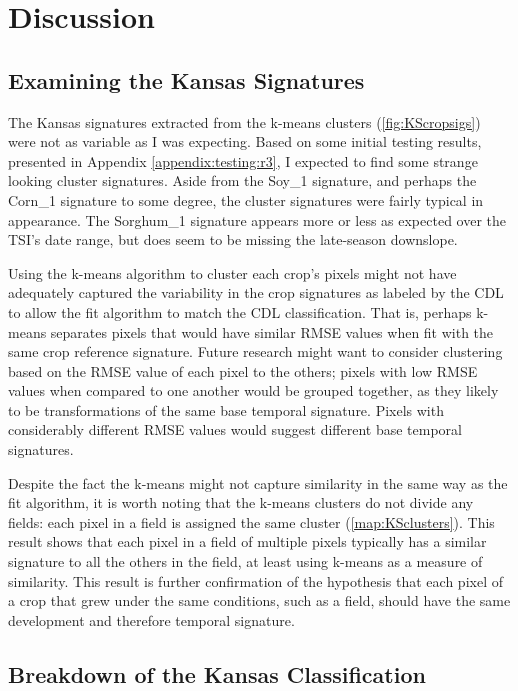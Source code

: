 \chapter{Discussion}

\section{Examining the Kansas Signatures}

The Kansas signatures extracted from the k-means clusters (\autoref{fig:KScropsigs}) were not as variable as I was expecting. Based on some initial testing results, presented in Appendix \ref{appendix:testing:r3}, I expected to find some strange looking cluster signatures. Aside from the Soy\_1 signature, and perhaps the Corn\_1 signature to some degree, the cluster signatures were fairly typical in appearance. The Sorghum\_1 signature appears more or less as expected over the TSI's date range, but does seem to be missing the late-season downslope.

Using the k-means algorithm to cluster each crop's pixels might not have adequately captured the variability in the crop signatures as labeled by the CDL to allow the fit algorithm to match the CDL classification. That is, perhaps k-means separates pixels that would have similar RMSE values when fit with the same crop reference signature. Future research might want to consider clustering based on the RMSE value of each pixel to the others; pixels with low RMSE values when compared to one another would be grouped together, as they likely to be transformations of the same base temporal signature. Pixels with considerably different RMSE values would suggest different base temporal signatures.

Despite the fact the k-means might not capture similarity in the same way as the fit algorithm, it is worth noting that the k-means clusters do not divide any fields: each pixel in a field is assigned the same cluster (\autoref{map:KSclusters}). This result shows that each pixel in a field of multiple pixels typically has a similar signature to all the others in the field, at least using k-means as a measure of similarity. This result is further confirmation of the hypothesis that each pixel of a crop that grew under the same conditions, such as a field, should have the same development and therefore temporal signature.

\section{Breakdown of the Kansas Classification}

